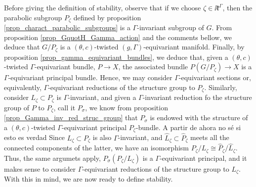 {Before giving the definition of stability, observe that if we choose \(\zeta \in \ii \mathfrak{k}^\Gamma\), then the parabolic subgroup \(P_\zeta\) defined by proposition \ref{prop_charact_parabolic_subgroups} is a \(\Gamma\)-invariant subgroup of \(G\). From proposition \ref{prop_GquotH_Gamma_action} and the comments bellow, we deduce that \(G/P_\zeta\) is a \((\theta, c)\)-twisted \((g, \Gamma)\)-equivariant manifold. Finally, by proposition \ref{prop_gamma_equivariant_bundles}, we deduce that, given a \((\theta,c)\)-twisted \(\Gamma\)-equivariant bundle, \(P\to X\), the associated bundle \(P(G/P_\zeta)\to X\) is a \(\Gamma\)-equivariant principal bundle. Hence, we may consider \(\Gamma\)-equivariant sections or, equivalently, \(\Gamma\)-equivariant reductions of the structure group to \(P_\zeta\). Similarly, consider \(L_\zeta \subset P_\zeta\) is \(\Gamma\)-invariant, and given a \(\Gamma\)-invariant reduction fo the structure group of \(P\) to \(P_\zeta\), call it \(P_\sigma\), we know from proposition \ref{prop_Gamma_inv_red_struc_group} that \(P_\sigma\) is endowed with the structure of a \((\theta,c)\)-twisted \(\Gamma\)-equivariant principal \(P_\zeta\)-bundle. {\color{red}A partir de ahora no sé si esto es verdad} Since \(L_\zeta\subset P_\zeta\) is also \(\Gamma\)-invariant, and \(\hat{L}_\zeta \subset \hat{P}_\zeta\) meets all the connected components of the latter, we have an isomorphism \(P_\zeta/L_\zeta\cong \hat{P}_\zeta/\hat{L}_\zeta\). Thus, the same argumets apply, \(P_\sigma(P_\zeta/L_\zeta)\) is a \(\Gamma\)-equivariant principal, and it makes sense to consider \(\Gamma\)-equivariant reductions of the structure group to \(L_\zeta\). With this in mind, we are now ready to define stability. 


}
